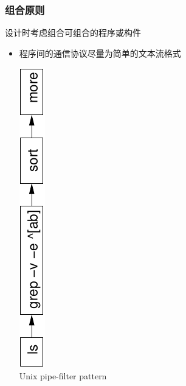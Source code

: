 \documentclass[compress]{beamer}
\begin{document}
\begin{frame}
\frametitle{组合原则}
设计时考虑组合可组合的程序或构件

\begin{itemize}

\item 程序间的通信协议尽量为简单的文本流格式 
\vspace{-1em}
\begin{center}\includegraphics[angle=-90,width=0.8\hsize]{pipe.pdf}\\[1em]
Unix pipe-filter pattern
\end{center}


\end{itemize}
\end{frame}
\end{document}

